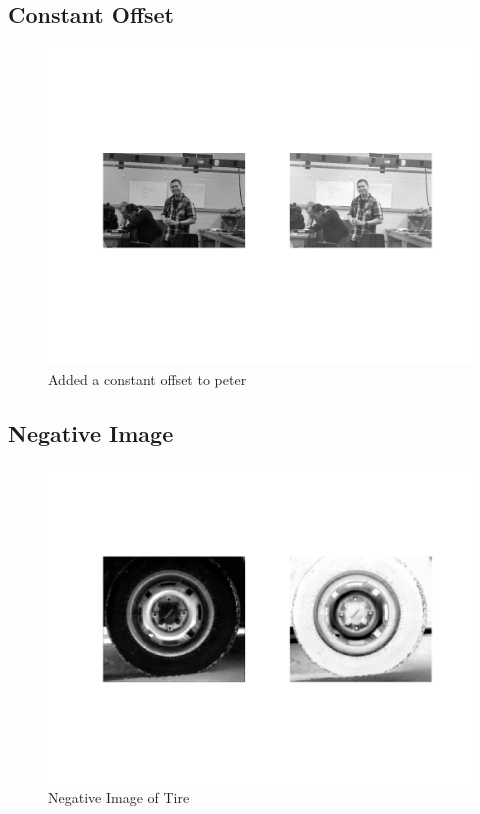 \subsection{Constant Offset}

\begin{figure}[H]
    \centering
    \includegraphics[scale=0.8]{twoPeters}
    \caption{Added a constant offset to peter}
\end{figure}

\subsection{Negative Image}

\begin{figure}[H]
    \centering
    \includegraphics[scale=0.8]{tire_neg}
    \caption{Negative Image of Tire}
\end{figure}

